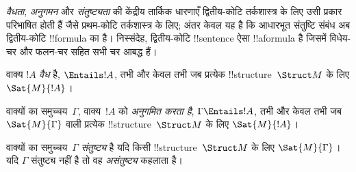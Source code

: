 \documentclass[../../../include/open-logic-section]{subfiles}
\begin{document}

\begin{explain}
\emph{वैधता}, \emph{अनुगमन} और \emph{संतुष्ट्यता} की केंद्रीय तार्किक
धारणाएँ द्वितीय-कोटि तर्कशास्त्र के लिए उसी प्रकार परिभाषित होती हैं जैसे
प्रथम-कोटि तर्कशास्त्र के लिए; अंतर केवल यह है कि आधारभूत संतुष्टि संबंध अब
द्वितीय-कोटि !!{formula} का है। निस्संदेह, द्वितीय-कोटि !!{sentence} ऐसा
!!a{formula} है जिसमें विधेय-चर और फलन-चर सहित सभी चर आबद्ध हैं।
\end{explain}

\begin{defn}[वैधता]
वाक्य $!A$ \emph{वैध} है, $\Entails !A$, तभी और केवल तभी जब प्रत्येक
!!{structure}~$\Struct M$ के लिए $\Sat{M}{!A}$।
\end{defn}

\begin{defn}[अनुगमन]
वाक्यों का समुच्चय~$\Gamma$, वाक्य~$!A$ को \emph{अनुगमित करता है}, $\Gamma
\Entails !A$, तभी और केवल तभी जब $\Sat{M}{\Gamma}$ वाली प्रत्येक
!!{structure}~$\Struct M$ के लिए $\Sat{M}{!A}$।
\end{defn}

\begin{defn}[संतुष्ट्यता]
वाक्यों का समुच्चय~$\Gamma$ \emph{संतुष्ट्य} है यदि किसी
!!{structure}~$\Struct M$ के लिए $\Sat{M}{\Gamma}$। यदि $\Gamma$ संतुष्ट्य
नहीं है तो वह \emph{असंतुष्ट्य} कहलाता है।
\end{defn}
\end{document}
